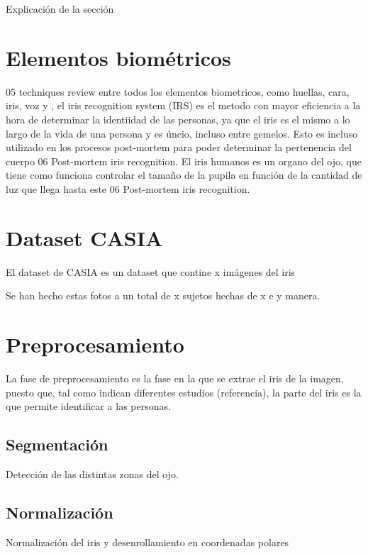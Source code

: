 
Explicación de la sección


\section{Elementos biométricos}

05 techniques review entre todos los elementos biometricos, como huellas, cara, iris, voz y , el iris recognition system (IRS) es el metodo con mayor eficiencia a la hora de determinar la identiidad
de las personas, ya que el iris es el mismo a lo largo de la vida de una persona y es úncio, incluso entre gemelos. Esto es incluso utilizado en los procesos 
post-mortem para poder determinar la pertenencia del cuerpo 06 Post-mortem iris recognition. El iris humanos es un organo del ojo, que tiene como funciona controlar el tamaño
de la pupila en función de la cantidad de luz que llega hasta este 06 Post-mortem iris recognition.

\section{Dataset CASIA}

El dataset de CASIA es un dataset que contine x imágenes del iris

Se han hecho estas fotos a un total de x sujetos hechas de x e y manera.



\section{Preprocesamiento}

La fase de preprocesamiento es la fase en la que se extrae el iris de la imagen, puesto que, tal como indican diferentes estudios (referencia), la parte del iris es la que 
permite identificar a las personas.

\subsection{Segmentación}

Detección de las distintas zonas del ojo.

\subsection{Normalización}

Normalización del iris y desenrollamiento en coordenadas polares


